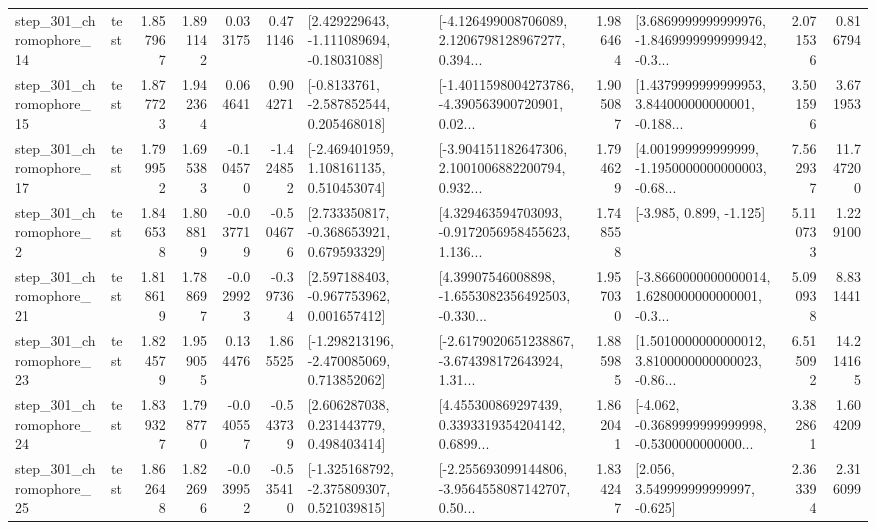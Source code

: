 \begin{tabular}{llrrrrllrlrr}
  step\_301\_chromophore\_14 &      test &      1.857967 &    1.891142 &      0.033175 &  0.471146 &    [2.429229643, -1.111089694, -0.18031088] &  [-4.126499008706089, 2.1206798128967277, 0.394... &       1.986464 &  [3.6869999999999976, -1.8469999999999942, -0.3... &            2.071536 &          0.816794 \\
  step\_301\_chromophore\_15 &      test &      1.877723 &    1.942364 &      0.064641 &  0.904271 &     [-0.8133761, -2.587852544, 0.205468018] &  [-1.4011598004273786, -4.390563900720901, 0.02... &       1.905087 &  [1.4379999999999953, 3.844000000000001, -0.188... &            3.501596 &          3.671953 \\
  step\_301\_chromophore\_17 &      test &      1.799952 &    1.695383 &     -0.104570 & -1.424852 &    [-2.469401959, 1.108161135, 0.510453074] &  [-3.904151182647306, 2.1001006882200794, 0.932... &       1.794629 &  [4.001999999999999, -1.1950000000000003, -0.68... &            7.562937 &         11.747200 \\
   step\_301\_chromophore\_2 &      test &      1.846538 &    1.808819 &     -0.037719 & -0.504676 &    [2.733350817, -0.368653921, 0.679593329] &  [4.329463594703093, -0.9172056958455623, 1.136... &       1.748558 &                            [-3.985, 0.899, -1.125] &            5.110733 &          1.229100 \\
  step\_301\_chromophore\_21 &      test &      1.818619 &    1.788697 &     -0.029923 & -0.397364 &    [2.597188403, -0.967753962, 0.001657412] &  [4.39907546008898, -1.6553082356492503, -0.330... &       1.957030 &  [-3.8660000000000014, 1.6280000000000001, -0.3... &            5.090938 &          8.831441 \\
  step\_301\_chromophore\_23 &      test &      1.824579 &    1.959055 &      0.134476 &  1.865525 &   [-1.298213196, -2.470085069, 0.713852062] &  [-2.6179020651238867, -3.674398172643924, 1.31... &       1.885985 &  [1.5010000000000012, 3.8100000000000023, -0.86... &            6.515092 &         14.214165 \\
  step\_301\_chromophore\_24 &      test &      1.839327 &    1.798770 &     -0.040557 & -0.543739 &     [2.606287038, 0.231443779, 0.498403414] &  [4.455300869297439, 0.3393319354204142, 0.6899... &       1.862041 &  [-4.062, -0.3689999999999998, -0.5300000000000... &            3.382861 &          1.604209 \\
  step\_301\_chromophore\_25 &      test &      1.862648 &    1.822696 &     -0.039952 & -0.535410 &   [-1.325168792, -2.375809307, 0.521039815] &  [-2.255693099144806, -3.9564558087142707, 0.50... &       1.834247 &                 [2.056, 3.549999999999997, -0.625] &            2.363394 &          2.316099 \\

\end{tabular}
